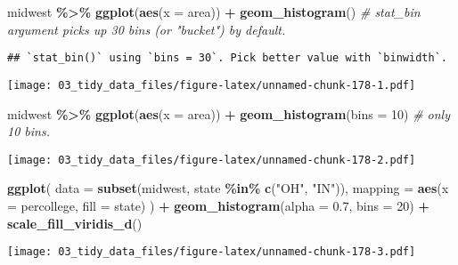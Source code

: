 \documentclass[
]{book}
\newenvironment{Shaded}{\begin{snugshade}}{\end{snugshade}}
\newcommand{\CommentTok}[1]{\textcolor[rgb]{0.56,0.35,0.01}{\textit{#1}}}
\newcommand{\DataTypeTok}[1]{\textcolor[rgb]{0.13,0.29,0.53}{#1}}
\newcommand{\DecValTok}[1]{\textcolor[rgb]{0.00,0.00,0.81}{#1}}
\newcommand{\FloatTok}[1]{\textcolor[rgb]{0.00,0.00,0.81}{#1}}
\newcommand{\KeywordTok}[1]{\textcolor[rgb]{0.13,0.29,0.53}{\textbf{#1}}}
\newcommand{\NormalTok}[1]{#1}
\newcommand{\OperatorTok}[1]{\textcolor[rgb]{0.81,0.36,0.00}{\textbf{#1}}}
\newcommand{\StringTok}[1]{\textcolor[rgb]{0.31,0.60,0.02}{#1}}
\begin{document}
\begin{Shaded}
\begin{Highlighting}[]
\NormalTok{midwest }\OperatorTok{\%\textgreater{}\%}
\StringTok{  }\KeywordTok{ggplot}\NormalTok{(}\KeywordTok{aes}\NormalTok{(}\DataTypeTok{x =}\NormalTok{ area)) }\OperatorTok{+}
\StringTok{  }\KeywordTok{geom\_histogram}\NormalTok{() }\CommentTok{\# stat\_bin argument picks up 30 bins (or "bucket") by default.}
\end{Highlighting}
\end{Shaded}

\begin{verbatim}
## `stat_bin()` using `bins = 30`. Pick better value with `binwidth`.
\end{verbatim}

\texttt{[image: 03\_tidy\_data\_files/figure-latex/unnamed-chunk-178-1.pdf]}

\begin{Shaded}
\begin{Highlighting}[]
\NormalTok{midwest }\OperatorTok{\%\textgreater{}\%}
\StringTok{  }\KeywordTok{ggplot}\NormalTok{(}\KeywordTok{aes}\NormalTok{(}\DataTypeTok{x =}\NormalTok{ area)) }\OperatorTok{+}
\StringTok{  }\KeywordTok{geom\_histogram}\NormalTok{(}\DataTypeTok{bins =} \DecValTok{10}\NormalTok{) }\CommentTok{\# only 10 bins.}
\end{Highlighting}
\end{Shaded}

\texttt{[image: 03\_tidy\_data\_files/figure-latex/unnamed-chunk-178-2.pdf]}

\begin{Shaded}
\begin{Highlighting}[]
\KeywordTok{ggplot}\NormalTok{(}
  \DataTypeTok{data =} \KeywordTok{subset}\NormalTok{(midwest, state }\OperatorTok{\%in\%}\StringTok{ }\KeywordTok{c}\NormalTok{(}\StringTok{"OH"}\NormalTok{, }\StringTok{"IN"}\NormalTok{)),}
  \DataTypeTok{mapping =} \KeywordTok{aes}\NormalTok{(}\DataTypeTok{x =}\NormalTok{ percollege, }\DataTypeTok{fill =}\NormalTok{ state)}
\NormalTok{) }\OperatorTok{+}
\StringTok{  }\KeywordTok{geom\_histogram}\NormalTok{(}\DataTypeTok{alpha =} \FloatTok{0.7}\NormalTok{, }\DataTypeTok{bins =} \DecValTok{20}\NormalTok{) }\OperatorTok{+}
\StringTok{  }\KeywordTok{scale\_fill\_viridis\_d}\NormalTok{()}
\end{Highlighting}
\end{Shaded}

\texttt{[image: 03\_tidy\_data\_files/figure-latex/unnamed-chunk-178-3.pdf]}
\end{document}
